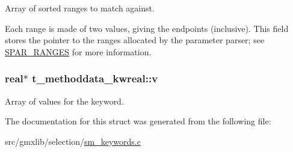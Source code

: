 \-Array of sorted ranges to match against. 

\-Each range is made of two values, giving the endpoints (inclusive). \-This field stores the pointer to the ranges allocated by the parameter parser; see \hyperlink{share_2template_2gromacs_2selparam_8h_ab39fef32ca729815df1299fafdd623b1}{\-S\-P\-A\-R\-\_\-\-R\-A\-N\-G\-E\-S} for more information. \hypertarget{structt__methoddata__kwreal_a2075d40476fabf10b1ec5569d9cf744a}{
\subsubsection[{v}]{\setlength{\rightskip}{0pt plus 5cm}real$\ast$ {\bf t\-\_\-methoddata\-\_\-kwreal\-::v}}}\label{structt__methoddata__kwreal_a2075d40476fabf10b1ec5569d9cf744a}
\-Array of values for the keyword. 

\-The documentation for this struct was generated from the following file\-:\begin{DoxyCompactItemize}
\item 
src/gmxlib/selection/\hyperlink{sm__keywords_8c}{sm\-\_\-keywords.\-c}\end{DoxyCompactItemize}
